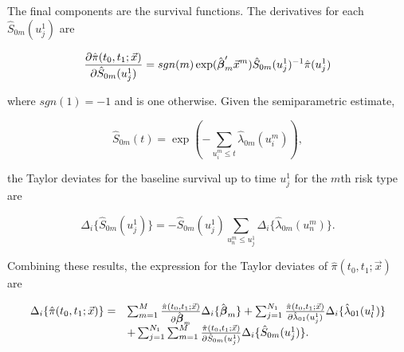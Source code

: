 \documentclass[11pt]{article}
\newcommand{\bbeta}{\mbox{\boldmath$\beta$}}
\begin{document}
The final components are the survival functions. The derivatives for each $\hat{S}_{0m}(u^1_j)$ are

\begin{equation}
\frac{\partial \hat{\pi}(t_0,t_1;\vec{x})}{\partial \hat{S}_{0m}(u^1_j)} = sgn(m) \exp ( \hat{\bbeta}_m'\vec{x}^m ) \hat{S}_{0m}(u^1_j)^{-1}  \hat{\pi}(u^1_j)
\label{eq:surv_deriv}
\end{equation}

\noindent where $sgn(1) = -1$ and is one otherwise. Given the semiparametric estimate,


\begin{equation}
\hat{S}_{0m}(t) = \exp (- \sum_{u^m_{i} \leq t} \hat{\lambda}_{0m} (u^m_{i}) ),
\label{eq:surv_base}
\end{equation}

\noindent the Taylor deviates for the baseline survival up to time $u^1_j$ for the $m$th risk type are

\begin{equation}
\Delta_{i} \lbrace \hat{S}_{0m} (u^1_{j}) \rbrace  = - \hat{S}_{0m} (u^1_{j}) \sum_{u^{m}_{n}\leq u^1_j}  \Delta_{i} \lbrace \hat{\lambda}_{0m}(u^{m}_{n}) \rbrace.
\label{eq:surv_delta2}
\end{equation}

Combining these results, the expression for the Taylor deviates of $\hat{\pi}(t_0,t_1;\vec{x})$ are

\[
\begin{array}{ll}
\Delta_{i} \lbrace \hat{\pi}(t_0,t_1; \vec{x}) \rbrace =&  \sum_{m=1}^M \frac{\hat{\pi}(t_0,t_1; \vec{x})}{\partial \hat{\bbeta}_m} \Delta_{i} \lbrace \hat{\bbeta}_m \rbrace +  \sum_{{j}=1}^{N_1} \frac{\hat{\pi}(t_0,t_1; \vec{x})}{\partial \hat{\lambda}_{01} (u^1_{j}) }  \Delta_{i} \lbrace \hat{\lambda}_{01} (u^1_l) \rbrace \\
&+ \sum_{{j}=1}^{N_1} \sum_{m=1}^M  \frac{\hat{\pi}(t_0,t_1; \vec{x})}{\partial \hat{S}_{0m} (u^1_{j})} \Delta_{i} \lbrace \hat{S}_{0m} (u^1_{j}) \rbrace.
\end{array}
\]

​
\end{document}
